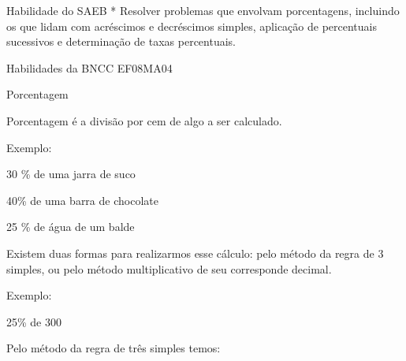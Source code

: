 Habilidade do SAEB * Resolver problemas que envolvam porcentagens,
incluindo os que lidam com acréscimos e decréscimos simples, aplicação
de percentuais sucessivos e determinação de taxas percentuais.

Habilidades da BNCC EF08MA04

Porcentagem

Porcentagem é a divisão por cem de algo a ser calculado.

Exemplo:

30 \% de uma jarra de suco

40\% de uma barra de chocolate

25 \% de água de um balde

Existem duas formas para realizarmos esse cálculo: pelo método da regra
de 3 simples, ou pelo método multiplicativo de seu corresponde decimal.

Exemplo:

25\% de 300

Pelo método da regra de três simples temos:

